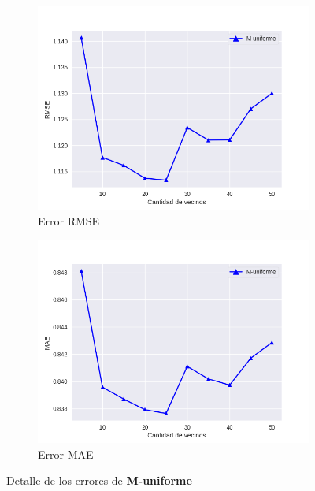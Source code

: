 \documentclass[hidelinks,12pt,a4paper]{book}
\theoremstyle{plain}
\theoremstyle{definition}
\begin{document}
\begin{figure}[!ht]
\centering
    \begin{subfigure}[b]{0.5\textwidth}            
            \includegraphics[width=\textwidth]{graficos/cold-2-rmse.png}
            \caption{Error RMSE}
    \end{subfigure}%
    \begin{subfigure}[b]{0.5\textwidth}
            \centering
            \includegraphics[width=\textwidth]{graficos/cold-2-mae.png}
            \caption{Error MAE}
    \end{subfigure}
    \caption{Detalle de los errores de \textbf{M-uniforme}}\label{fig:cold2}
\end{figure}
\end{document}
